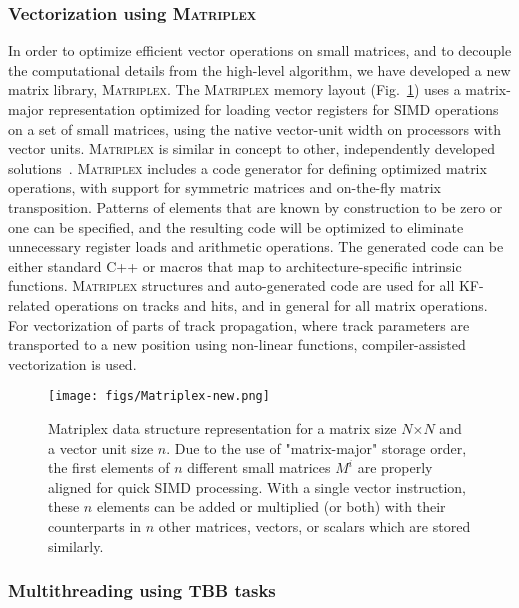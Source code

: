 \documentclass[a4paper,11pt]{article}
\newcommand{\Matriplex}{\textsc{Matriplex}\xspace}
\begin{document}
\subsubsection{Vectorization using \Matriplex}

In order to optimize efficient vector operations on small matrices, and to decouple the computational details from the high-level algorithm, we have developed a new matrix library, \Matriplex. The \Matriplex memory layout (Fig.~\ref{fig:matriplex}) uses a matrix-major representation optimized for loading vector registers for SIMD operations on a set of small matrices, using the native vector-unit width on processors with vector units. \Matriplex is similar in concept to other, independently developed solutions~\cite{Kyungjoo}. \Matriplex includes a code generator for defining optimized matrix operations, with support for symmetric matrices and on-the-fly matrix transposition. Patterns of elements that are known by construction to be zero or one can be specified, and the resulting code will be optimized to eliminate unnecessary register loads and arithmetic operations. The generated code can be either standard C++ or macros that map to architecture-specific intrinsic functions.
\Matriplex structures and auto-generated code are used for all KF-related operations on tracks and hits, and in general for all matrix operations. For vectorization of parts of track propagation, where track parameters are transported to a new position using non-linear functions, compiler-assisted vectorization is used.

\begin{figure}[h]
\centering\texttt{[image: figs/Matriplex-new.png]}
\caption{Matriplex data structure representation for a matrix size $N$$\times$$N$ and a vector unit size $n$. Due to the use of "matrix-major" storage order, the first elements of $n$ different small matrices $M^i$ are properly aligned for quick SIMD processing. With a single vector instruction, these $n$ elements can be added or multiplied (or both) with their counterparts in $n$ other matrices, vectors, or scalars which are stored similarly.}
\label{fig:matriplex}
\end{figure}

\subsubsection{Multithreading using TBB tasks}
 
\end{document}
